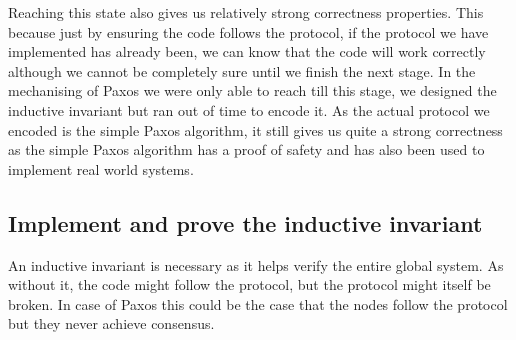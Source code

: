Reaching this state also gives us relatively strong correctness properties. This
because just by ensuring the code follows the protocol, if the protocol we have
implemented has already been, we can know that the code will work correctly
although we cannot be completely sure until we finish the next stage.
In the mechanising of Paxos we were only able to reach till this stage,
we designed the inductive invariant but ran out of time to encode it.
As the actual protocol we encoded is the simple Paxos algorithm, it still
gives us quite a strong correctness as the simple Paxos algorithm has a proof
of safety and has also been used to implement real world systems.

\subsection{Implement and prove the inductive invariant}
An inductive invariant is necessary as it helps verify the entire
global system. As without it, the code might follow the protocol, but the
protocol might itself be broken. In case of Paxos this could be the case that
the nodes follow the protocol but they never achieve consensus.
